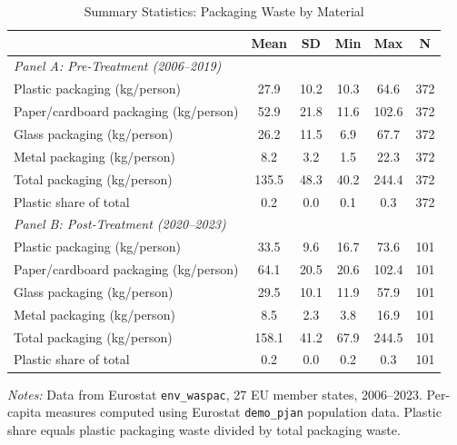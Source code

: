 \begin{table}[t]
\centering
\caption{Summary Statistics: Packaging Waste by Material}
\label{tab:summary}
\begin{tabular}{lccccc}
\toprule
  & Mean & SD & Min & Max & N \\
\midrule
\multicolumn{6}{l}{\textit{Panel A: Pre-Treatment (2006--2019)}} \\[3pt]
  Plastic packaging (kg/person) & 27.9 & 10.2 & 10.3 & 64.6 & 372 \\
  Paper/cardboard packaging (kg/person) & 52.9 & 21.8 & 11.6 & 102.6 & 372 \\
  Glass packaging (kg/person) & 26.2 & 11.5 & 6.9 & 67.7 & 372 \\
  Metal packaging (kg/person) & 8.2 & 3.2 & 1.5 & 22.3 & 372 \\
  Total packaging (kg/person) & 135.5 & 48.3 & 40.2 & 244.4 & 372 \\
  Plastic share of total & 0.2 & 0.0 & 0.1 & 0.3 & 372 \\
\midrule
\multicolumn{6}{l}{\textit{Panel B: Post-Treatment (2020--2023)}} \\[3pt]
  Plastic packaging (kg/person) & 33.5 & 9.6 & 16.7 & 73.6 & 101 \\
  Paper/cardboard packaging (kg/person) & 64.1 & 20.5 & 20.6 & 102.4 & 101 \\
  Glass packaging (kg/person) & 29.5 & 10.1 & 11.9 & 57.9 & 101 \\
  Metal packaging (kg/person) & 8.5 & 2.3 & 3.8 & 16.9 & 101 \\
  Total packaging (kg/person) & 158.1 & 41.2 & 67.9 & 244.5 & 101 \\
  Plastic share of total & 0.2 & 0.0 & 0.2 & 0.3 & 101 \\
\bottomrule
\end{tabular}
\begin{tablenotes}[flushleft]
\small
\item \textit{Notes:} Data from Eurostat \texttt{env\_waspac}, 27 EU member states, 2006--2023. Per-capita measures computed using Eurostat \texttt{demo\_pjan} population data. Plastic share equals plastic packaging waste divided by total packaging waste.
\end{tablenotes}
\end{table}
